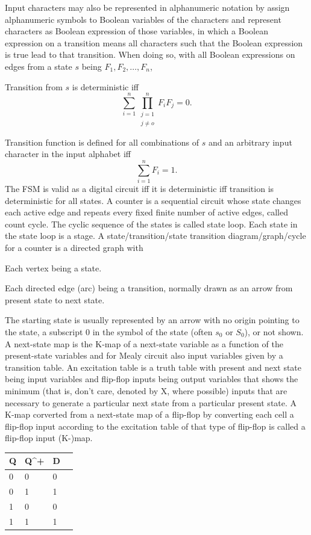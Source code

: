 \documentclass[a4paper,12pt]{report}
\begin{document}
Input characters may also be represented in alphanumeric notation by assign alphanumeric symbols to Boolean variables of the characters and represent characters as Boolean expression of those variables, in which a Boolean expression on a transition means all characters such that the Boolean expression is true lead to that transition. When doing so, with all Boolean expressions on edges from a state $s$ being $F_1,F_2,\ldots,F_n$,
\bit
\item Transition from $s$ is deterministic iff
\[\sum_{i=1}^n\prod_{\substack{j=1\\j\neq o}}^n F_iF_j=0.\]
\item Transition function is defined for all combinations of $s$ and an arbitrary input character in the input alphabet iff
\[\sum_{i=1}^nF_i=1.\]
\eit
The FSM is valid as a digital circuit iff it is deterministic iff transition is deterministic for all states.
A counter is a sequential circuit whose state changes each active edge and repeats every fixed finite number of active edges, called count cycle. The cyclic sequence of the states is called state loop. Each state in the state loop is a stage.
A state/transition/state transition diagram/graph/cycle for a counter is a directed graph with
\bit
\item Each vertex being a state.
\item Each directed edge (arc) being a transition, normally drawn as an arrow from present state to next state.
\item The starting state is usually represented by an arrow with no origin pointing to the state, a subscript 0 in the symbol of the state (often $s_0$ or $S_0$), or not shown.
\eit
{}
A next-state map is the K-map of a next-state variable as a function of the present-state variables and for Mealy circuit also input variables given by a transition table.
An excitation table is a truth table with present and next state being input variables and flip-flop inputs being output variables that shows the minimum (that is, don't care, denoted by X, where possible) inputs that are necessary to generate a particular next state from a particular present state.
A K-map corverted from a next-state map of a flip-flop by converting each cell a flip-flop input according to the excitation table of that type of flip-flop is called a flip-flop input (K-)map.
\begin{longtable}[c]{mm|mm}
\hline
Q & Q^+ & D \\\hline
0 & 0 & 0 \\\hline
0 & 1 & 1 \\\hline
1 & 0 & 0 \\\hline
1 & 1 & 1 \\\hline
\end{longtable}
\end{document}
